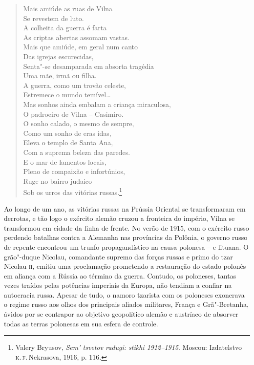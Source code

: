 \begin{verse}
Mais amiúde as ruas de Vilna\\
Se revestem de luto.\\
A colheita da guerra é farta\\
As criptas abertas assomam vastas.\\[10pt]
Mais que amiúde, em geral num canto\\
Das igrejas escurecidas,\\
Senta"-se desamparada em absorta tragédia\\
Uma mãe, irmã ou filha.\\[10pt]
A guerra, como um trovão celeste,\\
Estremece o mundo temível\ldots{}\\
Mas sonhos ainda embalam a criança miraculosa,\\
O padroeiro de Vilna -- Casimiro.\\[10pt]
O sonho calado, o mesmo de sempre,\\
Como um sonho de eras idas,\\
Eleva o templo de Santa Ana,\\
Com a suprema beleza das paredes.\\[10pt]
E o mar de lamentos locais,\\
Pleno de compaixão e infortúnios,\\
Ruge no bairro judaico\\
Sob os urros das vitórias russas.\footnote{Valery Bryusov, \textit{Sem' tsvetov radugi: stikhi 1912--1915}. Moscou: Izdatelstvo \textsc{k.\,f.}\,Nekrasova, 1916, p. 116.}
\end{verse}

Ao longo de um ano, as vitórias russas na Prússia Oriental se
transformaram em derrotas, e tão logo o exército alemão cruzou a
fronteira do império, Vilna se transformou em cidade da linha de frente.
No verão de 1915, com o exército russo perdendo batalhas contra a
Alemanha nas províncias da Polônia, o governo russo de repente encontrou
um trunfo propagandístico na causa polonesa -- e lituana. O grão"-duque
Nicolau, comandante supremo das forças russas e primo do tzar Nicolau
\textsc{ii}, emitiu uma proclamação prometendo a restauração do estado polonês em
aliança com a Rússia ao término da guerra. Contudo, os poloneses, tantas
vezes traídos pelas potências imperiais da Europa, não tendiam a confiar
na autocracia russa. Apesar de tudo, o namoro tzarista com os poloneses
exonerava o regime russo aos olhos dos principais aliados militares,
França e Grã"-Bretanha, ávidos por se contrapor ao objetivo geopolítico
alemão e austríaco de absorver todas as terras polonesas em sua esfera
de controle.

